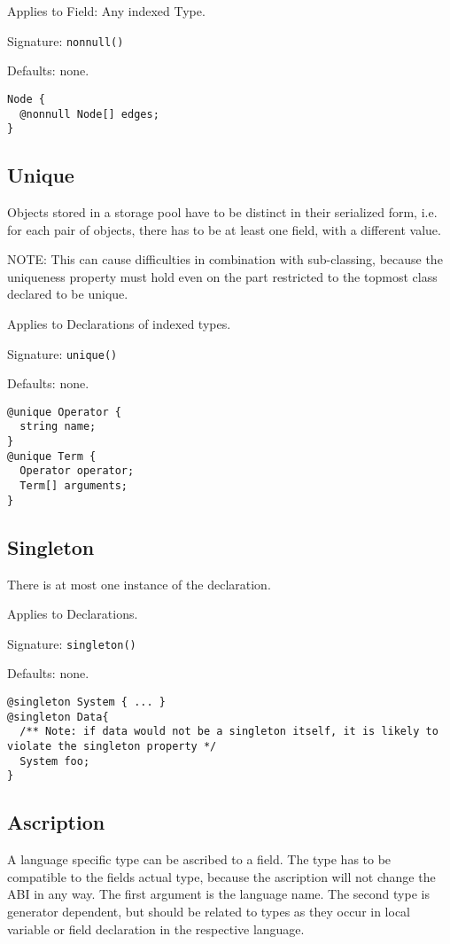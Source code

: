 \documentclass[a4paper,10pt]{article}
\begin{document}
Applies to Field: Any indexed Type.

Signature: \verb/nonnull()/

Defaults: none.

\begin{lstlisting}[label=nonnullExample,caption=Examples,language=skill]
Node {
  @nonnull Node[] edges;
}
\end{lstlisting}


\subsection*{Unique}
Objects stored in a storage pool have to be distinct in their serialized form, i.e. for each pair of objects, there has to be at least one field, with a different value.

NOTE: This can cause difficulties in combination with sub-classing, because the uniqueness property must hold even on the part restricted to the topmost class declared to be unique.

Applies to Declarations of indexed types.

Signature: \verb/unique()/

Defaults: none.

\begin{lstlisting}[label=uniqueExample,caption=Examples,language=skill]
@unique Operator {
  string name;
}
@unique Term {
  Operator operator;
  Term[] arguments;
}
\end{lstlisting}


\subsection*{Singleton}
There is at most one instance of the declaration.

Applies to Declarations.

Signature: \verb/singleton()/

Defaults: none.

\begin{lstlisting}[label=singletonExample,caption=Examples,language=skill]
@singleton System { ... }
@singleton Data{
  /** Note: if data would not be a singleton itself, it is likely to violate the singleton property */
  System foo;
}
\end{lstlisting}


\subsection*{Ascription}
A language specific type can be ascribed to a field. The type has to be compatible to the fields actual type, because the ascription will not change the ABI in any way. The first argument is the language name. The second type is generator dependent, but should be related to types as they occur in local variable or field declaration in the respective language.
\end{document}

